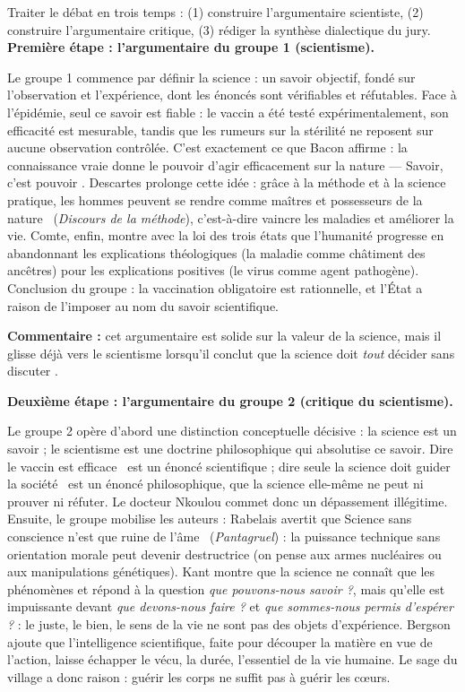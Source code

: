 \documentclass[11pt]{article}
\newcommand{\cle}[1]{{\popxbold\color{popdark}#1}}
\begin{document}
\begin{exoresolu}
Traiter le débat en trois temps : (1) construire l'argumentaire scientiste, (2) construire l'argumentaire critique, (3) rédiger la synthèse dialectique du jury.
\tcblower
\textbf{Première étape : l'argumentaire du groupe 1 (scientisme).}

Le groupe 1 commence par définir la science : un savoir objectif, fondé sur l'observation et l'expérience, dont les énoncés sont vérifiables et réfutables. Face à l'épidémie, seul ce savoir est fiable : le vaccin a été testé expérimentalement, son efficacité est mesurable, tandis que les rumeurs sur la stérilité ne reposent sur aucune observation contrôlée. C'est exactement ce que Bacon affirme : la connaissance vraie donne le pouvoir d'agir efficacement sur la nature --- \guillemotleft Savoir, c'est pouvoir \guillemotright. Descartes prolonge cette idée : grâce à la méthode et à la science pratique, les hommes peuvent se rendre \guillemotleft comme maîtres et possesseurs de la nature \guillemotright\ (\emph{Discours de la méthode}), c'est-à-dire vaincre les maladies et améliorer la vie. Comte, enfin, montre avec la loi des trois états que l'humanité progresse en abandonnant les explications théologiques (la maladie comme châtiment des ancêtres) pour les explications positives (le virus comme agent pathogène). Conclusion du groupe : la vaccination obligatoire est rationnelle, et l'État a raison de l'imposer au nom du savoir scientifique.

\textbf{Commentaire :} cet argumentaire est solide sur la valeur de la science, mais il glisse déjà vers le scientisme lorsqu'il conclut que la science doit \emph{tout} décider \guillemotleft sans discuter \guillemotright.

\textbf{Deuxième étape : l'argumentaire du groupe 2 (critique du scientisme).}

Le groupe 2 opère d'abord une distinction conceptuelle décisive : la \cle{science} est un savoir ; le \cle{scientisme} est une doctrine philosophique qui absolutise ce savoir. Dire \guillemotleft le vaccin est efficace \guillemotright\ est un énoncé scientifique ; dire \guillemotleft seule la science doit guider la société \guillemotright\ est un énoncé philosophique, que la science elle-même ne peut ni prouver ni réfuter. Le docteur Nkoulou commet donc un dépassement illégitime. Ensuite, le groupe mobilise les auteurs : Rabelais avertit que \guillemotleft Science sans conscience n'est que ruine de l'âme \guillemotright\ (\emph{Pantagruel}) : la puissance technique sans orientation morale peut devenir destructrice (on pense aux armes nucléaires ou aux manipulations génétiques). Kant montre que la science ne connaît que les phénomènes et répond à la question \emph{que pouvons-nous savoir ?}, mais qu'elle est impuissante devant \emph{que devons-nous faire ?} et \emph{que sommes-nous permis d'espérer ?} : le juste, le bien, le sens de la vie ne sont pas des objets d'expérience. Bergson ajoute que l'intelligence scientifique, faite pour découper la matière en vue de l'action, laisse échapper le vécu, la durée, l'essentiel de la vie humaine. Le sage du village a donc raison : guérir les corps ne suffit pas à guérir les cœurs.


\end{exoresolu}
\end{document}
